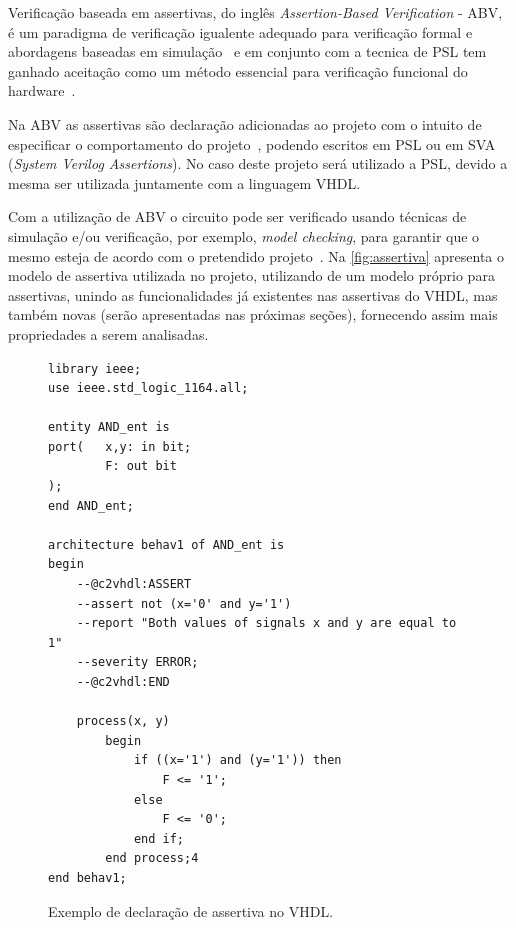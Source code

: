 Verificação baseada em assertivas, do inglês \textit{Assertion-Based Verification} - ABV, é um paradigma de verificação igualente adequado para verificação formal e abordagens baseadas em simulação~\cite{boule2005incorporating} e em conjunto com a tecnica de PSL tem ganhado aceitação como um método essencial para verificação funcional do hardware~\cite{DahanCombining}.

\par
Na ABV as assertivas são declaração adicionadas ao projeto com o intuito de especificar o comportamento do projeto~\cite{boule2005incorporating}, podendo escritos em PSL ou em SVA (\textit{System Verilog Assertions}). No caso deste projeto será utilizado a PSL, devido a mesma ser utilizada juntamente com a linguagem VHDL.

\par
Com a utilização de ABV o circuito pode ser verificado usando técnicas de simulação e/ou verificação, por exemplo, \textit{model checking}, para garantir que o mesmo esteja de acordo com o pretendido projeto~\cite{DahanCombining}. 
% 
Na \autoref{fig:assertiva} apresenta o modelo de assertiva utilizada no projeto, utilizando de um modelo próprio para assertivas, unindo as funcionalidades já existentes nas assertivas do VHDL, mas também novas (serão apresentadas nas próximas seções), fornecendo assim mais propriedades a serem analisadas.


\begin{figure}[thp]
\caption{\label{fig:assertiva} Exemplo de declaração de assertiva no VHDL.}
	\begin{center}
    \begin{minipage}{0.9\textwidth}
    \begin{lstlisting}       
library ieee;
use ieee.std_logic_1164.all;

entity AND_ent is
port(   x,y: in bit;
        F: out bit
);
end AND_ent;

architecture behav1 of AND_ent is
begin
	--@c2vhdl:ASSERT
    --assert not (x='0' and y='1')
    --report "Both values of signals x and y are equal to 1"
    --severity ERROR;
    --@c2vhdl:END

	process(x, y)
    	begin
        	if ((x='1') and (y='1')) then
            	F <= '1';
        	else
            	F <= '0';
        	end if;
    	end process;4
end behav1;

\end{lstlisting}
    \end{minipage}
	\end{center}
\end{figure}
